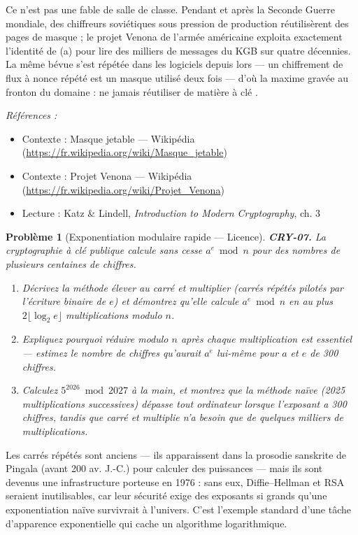 \documentclass[11pt]{article}
\newtheorem{problem}{Problème}
\newenvironment{refs}{\par\small\noindent\emph{Références :}\begin{itemize}\setlength\itemsep{0pt}}{\end{itemize}\normalsize}
\begin{document}
\noindent Ce n'est pas une fable de salle de classe. Pendant et après la Seconde
Guerre mondiale, des chiffreurs soviétiques sous pression de production réutilisèrent des
pages de masque ; le projet Venona de l'armée américaine exploita exactement l'identité de
(a) pour lire des milliers de messages du KGB sur quatre décennies. La même bévue s'est
répétée dans les logiciels depuis lors --- un chiffrement de flux à nonce répété est un masque
utilisé deux fois --- d'où la maxime gravée au fronton du domaine : \og{} ne jamais réutiliser de
matière à clé \fg{}.

\begin{refs}
\item Contexte : Masque jetable --- Wikipédia (\url{https://fr.wikipedia.org/wiki/Masque_jetable})
\item Contexte : Projet Venona --- Wikipédia (\url{https://fr.wikipedia.org/wiki/Projet_Venona})
\item Lecture : Katz \& Lindell, \textit{Introduction to Modern Cryptography}, ch. 3
\end{refs}

\bigskip

\begin{problem}[{Exponentiation modulaire rapide --- Licence}]
\textbf{CRY-07.} La cryptographie à clé publique calcule sans cesse
$a^e \bmod n$ pour des nombres de plusieurs centaines de chiffres.
\begin{enumerate}
\item[(a)] Décrivez la
méthode \og{} élever au carré et multiplier \fg{} (carrés répétés pilotés par l'écriture binaire de
$e$) et démontrez qu'elle calcule $a^e \bmod n$ en au plus
$2\lfloor \log_2 e \rfloor$ multiplications modulo $n$.
\item[(b)] Expliquez pourquoi réduire
modulo $n$ après chaque multiplication est essentiel --- estimez le nombre de chiffres
qu'aurait $a^e$ lui-même pour $a$ et $e$ de 300 chiffres.
\item[(c)] Calculez
$5^{2026} \bmod 2027$ à la main, et montrez que la méthode naïve (2025 multiplications
successives) dépasse tout ordinateur lorsque l'exposant a 300 chiffres, tandis que
\og{} carré et multiplie \fg{} n'a besoin que de quelques milliers de multiplications.
\end{enumerate}

\end{problem}

\noindent Les carrés répétés sont anciens --- ils apparaissent dans la prosodie
sanskrite de Pingala (avant 200 av. J.-C.) pour calculer des puissances --- mais ils sont
devenus une infrastructure porteuse en 1976 : sans eux, Diffie--Hellman et RSA seraient
inutilisables, car leur sécurité exige des exposants si grands qu'une exponentiation naïve
survivrait à l'univers. C'est l'exemple standard d'une tâche d'apparence exponentielle qui
cache un algorithme logarithmique.
\end{document}
